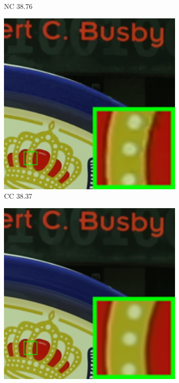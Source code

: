 \begin{figure}
\begin{subfigure}[t]{0.19\textwidth}
		\caption{NC 38.76}
    \end{subfigure}
    \hfill
    \begin{subfigure}[t]{0.19\textwidth}
        \centering
        \includegraphics[width=1\textwidth]{images/twsc/cc/resize_br_CCNoise_5dmark3_iso3200_1.png}
		\caption{CC 38.37}
    \end{subfigure}
    \hfill
    \begin{subfigure}[t]{0.19\textwidth}
        \centering
        \includegraphics[width=1\textwidth]{images/twsc/cc/resize_br_TWSC_5dmark3_iso3200_1.png}

\end{subfigure}
\end{figure}
